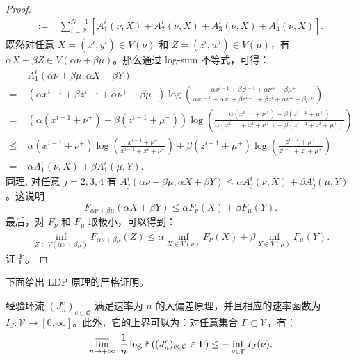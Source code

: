 \begin{proof}
\begin{align*}
		:=&\;\sum_{i=2}^{N-1}[A_1^i(\nu,X)+A_2^i(\nu,X)+A_3^i(\nu,X)+A_4^i(\nu,X)].
	\end{align*}
	既然对任意 $X=(x^i,y^i)\in V(\nu)$ 和 $Z=(z^i,w^i)\in V(\mu)$，有 $\alpha X+\beta Z\in V(\alpha\nu+\beta\mu)$。那么通过 log-sum 不等式，可得：
	\begin{align*}
		&\;A_1^i(\alpha\nu+\beta \mu,\alpha X+\beta Y)\\
		=&\;(\alpha x^{i-1}+\beta z^{i-1}+\alpha\nu^++\beta \mu^+ )\log\left(\frac{\alpha x^{i-1}+\beta z^{i-1}+\alpha\nu^++\beta \mu^+}{\alpha x^{i-1}+\alpha x^i+\beta z^{i-1}+\beta z^i+\alpha\nu^++\beta \mu^+}\right)\\
		=&\;(\alpha (x^{i-1}+\nu^+)+\beta (z^{i-1}+ \mu^+) )\log\left(\frac{\alpha (x^{i-1}+\nu^+)+\beta (z^{i-1}+ \mu^+)}{\alpha (x^{i-1}+ x^i+\nu^+)+\beta (z^{i-1}+ z^i+ \mu^+)}\right)\\
		\le &\; \alpha (x^{i-1}+\nu^+)\log\left(\frac{x^{i-1}+\nu^+}{x^{i-1}+ x^i+\nu^+}\right)+\beta (z^{i-1}+ \mu^+)\log\left(\frac{z^{i-1}+ \mu^+}{z^{i-1}+ z^i+ \mu^+}\right)\\
		=&\;\alpha A^i_1(\nu,X)+\beta A^i_1(\mu,Y).
	\end{align*}
	同理, 对任意 $j=2,3,4$ 有 $A^i_j(\alpha \nu+\beta \mu,\alpha X+\beta Y)\le \alpha A^i_j(\nu,X)+\beta A^i_j (\mu,Y)$。这说明
	\begin{equation*}
		F_{\alpha \nu+\beta \mu}(\alpha X+\beta Y)\le \alpha F_{\nu}(X)+\beta F_{\mu}(Y).
	\end{equation*}
	最后，对 $F_{\nu}$ 和 $F_{\mu}$ 取极小，可以得到：
	\begin{align*}
		\inf_{Z\in V(\alpha\nu+\beta\mu)}F_{\alpha\nu+\beta\mu}( Z)\le\alpha \inf_{X\in V(\nu)} F_{\nu}(X)+\beta \inf_{Y\in V(\mu)} F_{\mu}(Y).
	\end{align*}
	证毕。
\end{proof}
下面给出 LDP 原理的严格证明。
\\
\begin{proposition}\label{theorem:LDP}
	经验环流 $(J^c_n)_{c\in\mathcal{C}}$ 满足速率为 $n$ 的大偏差原理，并且相应的速率函数为 $I_J:\mathcal{V}\to [0,\infty]$。此外，它的上界可以为：对任意集合 $\Gamma \subset \mathcal{V}$，有：
	\begin{align}\label{upper bound}
		\varlimsup_{n\to+\infty}\;
		\frac 1n \log \mathbb  P \left( (J^c_n)_{c\in \mathcal{C}} \in \Gamma \right)
		\le -\inf_{\nu\in \Gamma} I_J(\nu).
	\end{align}
\end{proposition}
